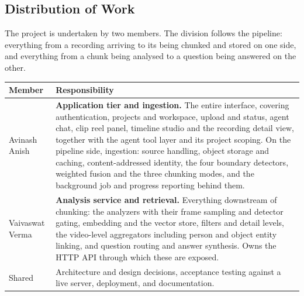 \subsection{Distribution of Work}

The project is undertaken by two members. The division follows the pipeline:
everything from a recording arriving to its being chunked and stored on one side, and
everything from a chunk being analysed to a question being answered on the other.

\begin{table}[htbp]
\centering
\small
\begin{tabularx}{\textwidth}{@{}L{4.2cm}X@{}}
\toprule
\textbf{Member} & \textbf{Responsibility} \\
\midrule
Avinash Anish &
\textbf{Application tier and ingestion.} The entire interface, covering authentication,
projects and workspace, upload and status, agent chat, clip reel panel, timeline studio
and the recording detail view, together with the agent tool layer and its project
scoping. On the pipeline side, ingestion: source handling, object storage and caching,
content-addressed identity, the four boundary detectors, weighted fusion and the three
chunking modes, and the background job and progress reporting behind them. \\
Vaivaswat Verma &
\textbf{Analysis service and retrieval.} Everything downstream of chunking: the
analyzers with their frame sampling and detector gating, embedding and the vector
store, filters and detail levels, the video-level aggregators including person and
object entity linking, and question routing and answer synthesis. Owns the HTTP API
through which these are exposed. \\
\midrule
Shared &
Architecture and design decisions, acceptance testing against a live server,
deployment, and documentation. \\
\bottomrule
\end{tabularx}
\end{table}
